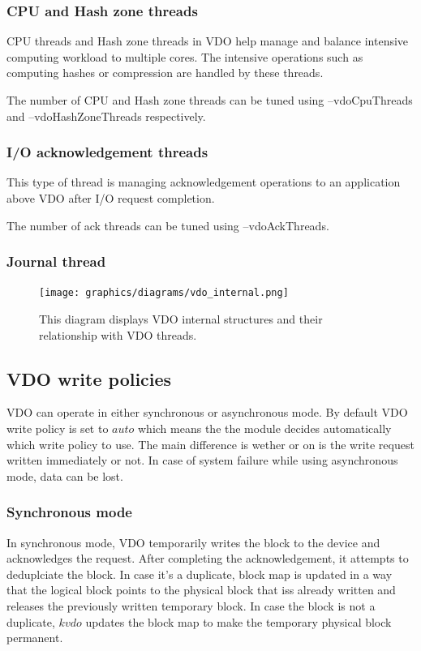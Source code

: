 \documentclass[
  color, %
  table, %
  lof,   %
  lot,   %
]{fithesis3}
\begin{document}
\subsubsection{CPU and Hash zone threads}
CPU threads and Hash zone threads in VDO help manage and balance intensive computing workload to multiple cores. The intensive operations such as computing hashes or compression are handled by these threads.

The number of CPU and Hash zone threads can be tuned using --vdoCpuThreads and --vdoHashZoneThreads respectively.

\subsubsection{I/O acknowledgement threads}
This type of thread is managing acknowledgement operations to an application above VDO after I/O request completion.

The number of ack threads can be tuned using --vdoAckThreads.

\subsubsection{Journal thread}



\addtolength{\textheight}{1.75in}
\begin{landscape}
\begin{figure}[!hb]
        \centering
        \texttt{[image: graphics/diagrams/vdo\_internal.png]}
\caption[VDO threads and internal structures]{This diagram displays VDO internal structures and their relationship with VDO threads.}
\label{fig:VDO-internals}
\end{figure}
\end{landscape}
\addtolength{\textheight}{-1.75in}



\subsection{VDO write policies}
VDO can operate in either synchronous or asynchronous mode. By default VDO write policy is set to $auto$ which means the the module decides automatically which write policy to use. The main difference is wether or on is the write request written immediately or not. In case of system failure while using asynchronous mode, data can be lost.

\subsubsection{Synchronous mode}
In synchronous mode, VDO temporarily writes the block to the device and acknowledges the request. After completing the acknowledgement, it attempts to deduplciate the block. In case it's a duplicate, block map is updated in a way that the logical block points to the physical block that iss already written and releases the previously written temporary block. In case the block is not a duplicate, $kvdo$ updates the block map to make the temporary physical block permanent.
\end{document}
